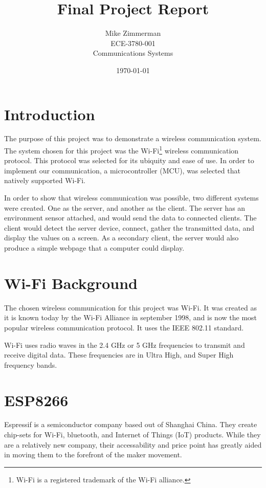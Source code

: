 \documentclass[onecolumn, 12pt]{IEEEConf}
\title{Final Project Report}
\author{Mike Zimmerman \\ ECE-3780-001 \\ Communications Systems}
\date{\today}
\begin{document}
    \maketitle
    \doublespacing
    \section{Introduction}
        The purpose of this project was to demonstrate a wireless communication system.
        The system chosen for this project was the Wi-Fi\footnote{Wi-Fi is a registered trademark of the Wi-Fi alliance.} wireless communication protocol.
        This protocol was selected for its ubiquity and ease of use.
        In order to implement our communication, a microcontroller (MCU), was selected that natively supported Wi-Fi.

        In order to show that wireless communication was possible, two different systems were created.
        One as the server, and another as the client.
        The server has an environment sensor attached, and would send the data to connected clients.
        The client would detect the server device, connect, gather the transmitted data, and display the values on a screen.
        As a secondary client, the server would also produce a simple webpage that a computer could display.

    \section{Wi-Fi Background}
        The chosen wireless communication for this project was Wi-Fi.
        It was created as it is known today by the Wi-Fi Alliance in september 1998, and is now the most popular wireless communication protocol.\cite{Wi-Fi_History}
        It uses the IEEE 802.11 standard. 

        Wi-Fi uses radio waves in the 2.4 GHz or 5 GHz frequencies to transmit and receive digital data.
        These frequencies are in Ultra High, and Super High frequency bands.

    \section{ESP8266}
        Espressif is a semiconductor company based out of Shanghai China. \cite{About_Espressif}
        They create chip-sets for Wi-Fi, bluetooth, and Internet of Things (IoT) products.
        While they are a relatively new company, their accessability and price point has
        greatly aided in moving them to the forefront of the maker movement.
\end{document}
